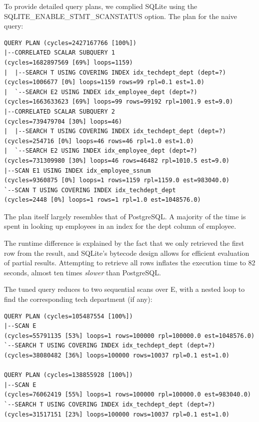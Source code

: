 \documentclass[11pt]{scrartcl}
\begin{document}
To provide detailed query plans, we complied SQLite using the SQLITE_ENABLE_STMT_SCANSTATUS option.  The plan for the naive query:

{\small
\parskip0pt\begin{verbatim}
QUERY PLAN (cycles=2427167766 [100%])
|--CORRELATED SCALAR SUBQUERY 1                                    (cycles=1682897569 [69%] loops=1159)
|  |--SEARCH T USING COVERING INDEX idx_techdept_dept (dept=?)     (cycles=1006677 [0%] loops=1159 rows=99 rpl=0.1 est=1.0)
|  `--SEARCH E2 USING INDEX idx_employee_dept (dept=?)             (cycles=1663633623 [69%] loops=99 rows=99192 rpl=1001.9 est=9.0)
|--CORRELATED SCALAR SUBQUERY 2                                    (cycles=739479704 [30%] loops=46)
|  |--SEARCH T USING COVERING INDEX idx_techdept_dept (dept=?)     (cycles=254716 [0%] loops=46 rows=46 rpl=1.0 est=1.0)
|  `--SEARCH E2 USING INDEX idx_employee_dept (dept=?)             (cycles=731309980 [30%] loops=46 rows=46482 rpl=1010.5 est=9.0)
|--SCAN E1 USING INDEX idx_employee_ssnum                          (cycles=9360875 [0%] loops=1 rows=1159 rpl=1159.0 est=983040.0)
`--SCAN T USING COVERING INDEX idx_techdept_dept                   (cycles=2448 [0%] loops=1 rows=1 rpl=1.0 est=1048576.0)
\end{verbatim}}

The plan itself largely resembles that of PostgreSQL.  A majority of the time is spent in looking up employees in an index for the dept column of employee.

The runtime difference is explained by the fact that we only retrieved the first row from the result, and SQLite's bytecode design allows for efficient evaluation of partial results.  Attempting to retrieve all rows inflates the execution time to 82 seconds, almost ten times \textit{slower} than PostgreSQL.

The tuned query reduces to two sequential scans over E, with a nested loop to find the corresponding tech department (if any):

{\small
\parskip0pt\begin{verbatim}
QUERY PLAN (cycles=105487554 [100%])
|--SCAN E                                                       (cycles=55791135 [53%] loops=1 rows=100000 rpl=100000.0 est=1048576.0)
`--SEARCH T USING COVERING INDEX idx_techdept_dept (dept=?)     (cycles=38080482 [36%] loops=100000 rows=10037 rpl=0.1 est=1.0)

QUERY PLAN (cycles=138855928 [100%])
|--SCAN E                                                       (cycles=76062419 [55%] loops=1 rows=100000 rpl=100000.0 est=983040.0)
`--SEARCH T USING COVERING INDEX idx_techdept_dept (dept=?)     (cycles=31517151 [23%] loops=100000 rows=10037 rpl=0.1 est=1.0)
\end{verbatim}}
\end{document}
